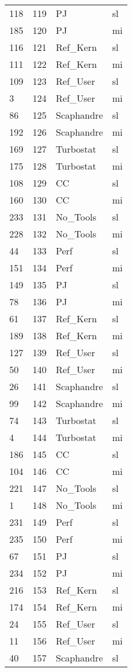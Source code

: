 \begin{tabular}{lrll}
118 & 119 & PJ & sl \\
185 & 120 & PJ & mi \\
116 & 121 & Ref_Kern & sl \\
111 & 122 & Ref_Kern & mi \\
109 & 123 & Ref_User & sl \\
3 & 124 & Ref_User & mi \\
86 & 125 & Scaphandre & sl \\
192 & 126 & Scaphandre & mi \\
169 & 127 & Turbostat & sl \\
175 & 128 & Turbostat & mi \\
108 & 129 & CC & sl \\
160 & 130 & CC & mi \\
233 & 131 & No_Tools & sl \\
228 & 132 & No_Tools & mi \\
44 & 133 & Perf & sl \\
151 & 134 & Perf & mi \\
149 & 135 & PJ & sl \\
78 & 136 & PJ & mi \\
61 & 137 & Ref_Kern & sl \\
189 & 138 & Ref_Kern & mi \\
127 & 139 & Ref_User & sl \\
50 & 140 & Ref_User & mi \\
26 & 141 & Scaphandre & sl \\
99 & 142 & Scaphandre & mi \\
74 & 143 & Turbostat & sl \\
4 & 144 & Turbostat & mi \\
186 & 145 & CC & sl \\
104 & 146 & CC & mi \\
221 & 147 & No_Tools & sl \\
1 & 148 & No_Tools & mi \\
231 & 149 & Perf & sl \\
235 & 150 & Perf & mi \\
67 & 151 & PJ & sl \\
234 & 152 & PJ & mi \\
216 & 153 & Ref_Kern & sl \\
174 & 154 & Ref_Kern & mi \\
24 & 155 & Ref_User & sl \\
11 & 156 & Ref_User & mi \\
40 & 157 & Scaphandre & sl \\

\end{tabular}
